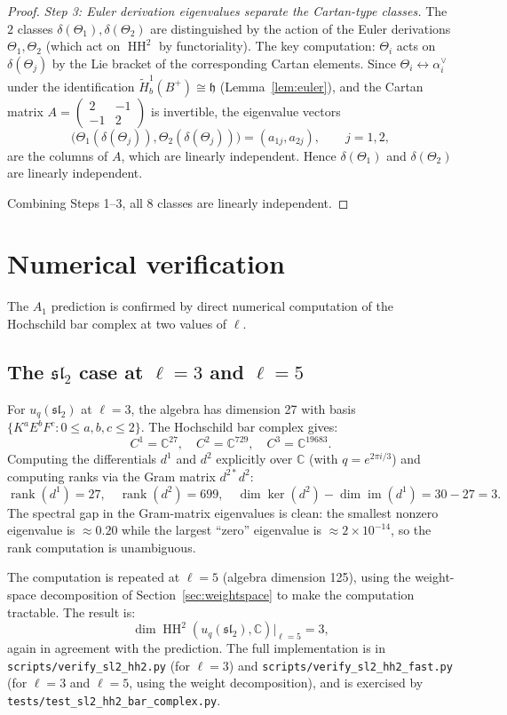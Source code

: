 \documentclass[11pt,letterpaper]{amsart}
\theoremstyle{plain}
\theoremstyle{definition}
\theoremstyle{remark}
\newcommand{\HH}{\operatorname{HH}}
\newcommand{\CC}{\mathbb{C}}
\begin{document}
\begin{proof}
\emph{Step 3: Euler derivation eigenvalues separate the Cartan-type classes.} The $2$ classes $\delta(\Theta_1), \delta(\Theta_2)$ are distinguished by the action of the Euler derivations $\Theta_1, \Theta_2$ (which act on $\HH^2$ by functoriality). The key computation: $\Theta_i$ acts on $\delta(\Theta_j)$ by the Lie bracket of the corresponding Cartan elements. Since $\Theta_i \leftrightarrow \alpha_i^\vee$ under the identification $\tilde{H}^1_b(B^+) \cong \mathfrak{h}$ (Lemma~\ref{lem:euler}), and the Cartan matrix $A = \begin{pmatrix} 2 & -1 \\ -1 & 2 \end{pmatrix}$ is invertible, the eigenvalue vectors
\[
\bigl(\Theta_1(\delta(\Theta_j)), \Theta_2(\delta(\Theta_j))\bigr) = (a_{1j}, a_{2j}), \qquad j = 1, 2,
\]
are the columns of $A$, which are linearly independent. Hence $\delta(\Theta_1)$ and $\delta(\Theta_2)$ are linearly independent.

Combining Steps 1--3, all $8$ classes are linearly independent.
\end{proof}

\section{Numerical verification}
\label{sec:numerical}
The $A_1$ prediction is confirmed by direct numerical computation of the Hochschild bar complex at two values of $\ell$.

\subsection{The $\mathfrak{sl}_2$ case at $\ell = 3$ and $\ell = 5$}

For $u_q(\mathfrak{sl}_2)$ at $\ell = 3$, the algebra has dimension 27 with basis $\{K^a E^b F^c : 0 \leq a,b,c \leq 2\}$. The Hochschild bar complex gives:
\[
C^1 = \CC^{27}, \quad C^2 = \CC^{729}, \quad C^3 = \CC^{19683}.
\]
Computing the differentials $d^1$ and $d^2$ explicitly over $\CC$ (with $q = e^{2\pi i/3}$) and computing ranks via the Gram matrix $d^{2*} d^2$:
\[
\operatorname{rank}(d^1) = 27, \quad \operatorname{rank}(d^2) = 699, \quad \dim \ker(d^2) - \dim \operatorname{im}(d^1) = 30 - 27 = 3.
\]
The spectral gap in the Gram-matrix eigenvalues is clean: the smallest nonzero eigenvalue is $\approx 0.20$ while the largest ``zero'' eigenvalue is $\approx 2 \times 10^{-14}$, so the rank computation is unambiguous.

The computation is repeated at $\ell = 5$ (algebra dimension 125), using the weight-space decomposition of Section~\ref{sec:weightspace} to make the computation tractable. The result is:
\[
\dim \HH^2(u_q(\mathfrak{sl}_2), \CC) \big|_{\ell=5} = 3,
\]
again in agreement with the prediction. The full implementation is in \texttt{scripts/verify\_sl2\_hh2.py} (for $\ell = 3$) and \texttt{scripts/verify\_sl2\_hh2\_fast.py} (for $\ell = 3$ and $\ell = 5$, using the weight decomposition), and is exercised by \texttt{tests/test\_sl2\_hh2\_bar\_complex.py}.
\end{document}
